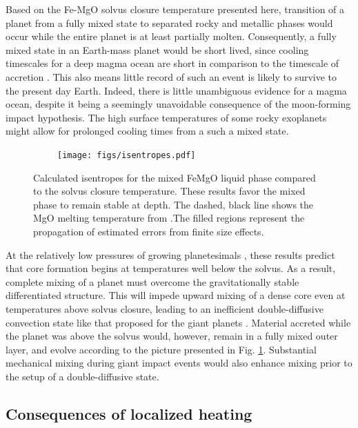 Based on the Fe-MgO solvus closure temperature presented here, transition of a planet
from a fully mixed state to separated rocky and metallic phases would occur while the entire
planet is at least partially molten. Consequently, a fully mixed state in an Earth-mass
planet would be short lived, since cooling timescales for a deep magma ocean are short in
comparison to the timescale of accretion \citep{Abe1997,Elkins-Tanton2012}. This also
means little record of such an event is likely to survive to the present day Earth. Indeed,
there is little unambiguous evidence for a magma ocean, despite it being a seemingly
unavoidable consequence of the moon-forming impact hypothesis. The high surface
temperatures of some rocky exoplanets \citep{Pepe2013} might allow for prolonged cooling
times from a such a mixed state.

\begin{figure}[h!]  
  \centering
    \texttt{[image: figs/isentropes.pdf]}  
\caption{Calculated isentropes for the mixed FeMgO liquid phase compared to the solvus
  closure temperature. These results favor the mixed phase to remain stable at depth. The
  dashed, black line shows the MgO melting temperature from \citep{Boates2013}.The filled
  regions represent the propagation of estimated errors from finite size effects.}
\label{fig:isentropes}
\end{figure}

At the relatively low pressures of growing planetesimals
\citep{Kleine2002,Sramek2012,Weiss2013}, these results predict that core formation begins
at temperatures well below the solvus. As a result, complete mixing of a planet must
overcome the gravitationally stable differentiated structure. This will impede upward
mixing of a dense core even at temperatures above solvus closure, leading to an inefficient
double-diffusive convection state like that proposed for the giant planets
\citep{Chabrier2007}. Material accreted while the planet was above the solvus would,
however, remain in a fully mixed outer layer, and evolve according to the picture
presented in Fig. \ref{fig:isentropes}. Substantial mechanical mixing during giant impact
events \citep{canup2004,Canup2012,Cuk2012} would also enhance mixing prior to the setup of
a double-diffusive state.

\subsection{Consequences of localized heating}

